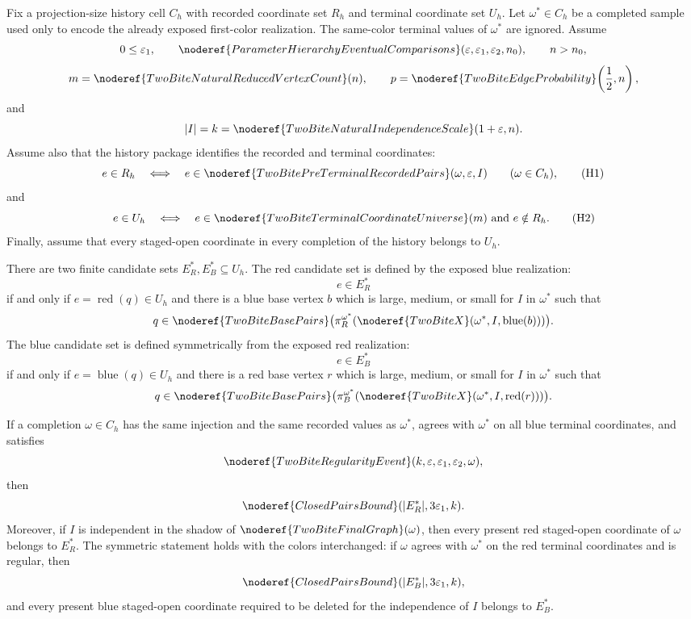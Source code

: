 \begin{helper}
Fix a projection-size history cell \(C_h\) with recorded coordinate set
\(R_h\) and terminal coordinate set \(U_h\).  Let \(\omega^\ast\in C_h\) be
a completed sample used only to encode the already exposed first-color
realization.  The same-color terminal values of \(\omega^\ast\) are ignored.
Assume
\[
0\le\varepsilon_1,\qquad
\noderef{ParameterHierarchyEventualComparisons}
(\varepsilon,\varepsilon_1,\varepsilon_2,n_0),\qquad n>n_0,
\]
\[
m=\noderef{TwoBiteNaturalReducedVertexCount}(n),\qquad
p=\noderef{TwoBiteEdgeProbability}\!\left(\frac12,n\right),
\]
and
\[
|I|=k=\noderef{TwoBiteNaturalIndependenceScale}(1+\varepsilon,n).
\]
Assume also that the history package identifies the recorded and terminal
coordinates:
\[
e\in R_h
\quad\Longleftrightarrow\quad
e\in\noderef{TwoBitePreTerminalRecordedPairs}(\omega,\varepsilon,I)
\qquad(\omega\in C_h),
\tag{H1}
\]
and
\[
e\in U_h
\quad\Longleftrightarrow\quad
e\in\noderef{TwoBiteTerminalCoordinateUniverse}(m)
\hbox{ and }e\notin R_h.
\tag{H2}
\]
Finally, assume that every staged-open coordinate in every completion of the
history belongs to \(U_h\).

There are two finite candidate sets \(E_R^\ast,E_B^\ast\subseteq U_h\).  The
red candidate set is defined by the exposed blue realization:
\[
e\in E_R^\ast
\]
if and only if \(e=\operatorname{red}(q)\in U_h\) and there is a blue base
vertex \(b\) which is large, medium, or small for \(I\) in \(\omega^\ast\)
such that
\[
q\in\noderef{TwoBiteBasePairs}
\bigl(\pi_R^{\omega^\ast}
(\noderef{TwoBiteX}(\omega^\ast,I,\operatorname{blue}(b)))\bigr).
\]
The blue candidate set is defined symmetrically from the exposed red
realization:
\[
e\in E_B^\ast
\]
if and only if \(e=\operatorname{blue}(q)\in U_h\) and there is a red base
vertex \(r\) which is large, medium, or small for \(I\) in \(\omega^\ast\)
such that
\[
q\in\noderef{TwoBiteBasePairs}
\bigl(\pi_B^{\omega^\ast}
(\noderef{TwoBiteX}(\omega^\ast,I,\operatorname{red}(r)))\bigr).
\]

If a completion \(\omega\in C_h\) has the same injection and the same
recorded values as \(\omega^\ast\), agrees with \(\omega^\ast\) on all blue
terminal coordinates, and satisfies
\[
\noderef{TwoBiteRegularityEvent}(k,\varepsilon,\varepsilon_1,\varepsilon_2,
\omega),
\]
then
\[
\noderef{ClosedPairsBound}(|E_R^\ast|,3\varepsilon_1,k).
\]
Moreover, if \(I\) is independent in the shadow of
\(\noderef{TwoBiteFinalGraph}(\omega)\), then every present red
staged-open coordinate of \(\omega\) belongs to \(E_R^\ast\).  The symmetric
statement holds with the colors interchanged: if \(\omega\) agrees with
\(\omega^\ast\) on the red terminal coordinates and is regular, then
\[
\noderef{ClosedPairsBound}(|E_B^\ast|,3\varepsilon_1,k),
\]
and every present blue staged-open coordinate required to be deleted for the
independence of \(I\) belongs to \(E_B^\ast\).
\end{helper}
